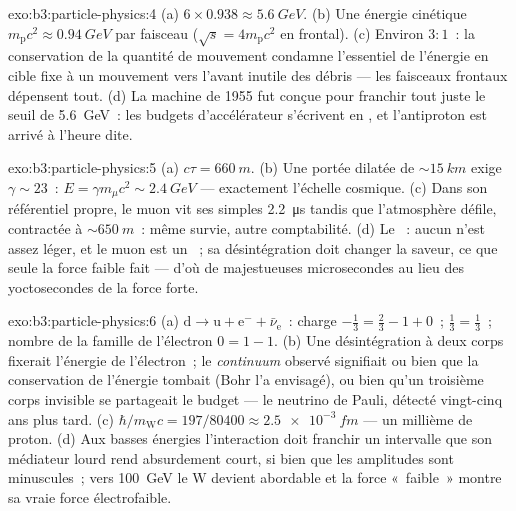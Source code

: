 \begin{solution}{exo:b3:particle-physics:4}
(a) $6\times0.938 \approx \qty{5.6}{GeV}$. (b) Une énergie cinétique
$m_{\text{p}}c^2 \approx \qty{0.94}{GeV}$ par faisceau
($\sqrt s = 4m_{\text{p}}c^2$ en frontal). (c) Environ $3:1$~: la
conservation de la quantité de mouvement condamne l'essentiel de
l'énergie en cible fixe à un mouvement vers l'avant inutile des
débris --- les faisceaux frontaux dépensent tout. (d) La machine de
1955 fut conçue pour franchir tout juste le seuil de
\qty{5.6}{GeV}~: les budgets d'accélérateur s'écrivent en , et l'antiproton est arrivé à l'heure dite.
\end{solution}

\begin{solution}{exo:b3:particle-physics:5}
(a) $c\tau = \qty{660}{m}$. (b) Une portée dilatée de
${\sim}\qty{15}{km}$ exige $\gamma \sim 23$~: $E = \gamma
m_\mu c^2 \sim \qty{2.4}{GeV}$ --- exactement l'échelle cosmique.
(c) Dans son référentiel propre, le muon vit ses simples
\qty{2.2}{\micro s} tandis que l'atmosphère défile, contractée à
${\sim}\qty{650}{m}$~: même survie, autre comptabilité. (d) Le
~: aucun  n'est assez léger, et le muon est
un ~; sa désintégration doit changer la saveur, ce que seule
la force faible fait --- d'où de majestueuses microsecondes au lieu
des yoctosecondes de la force forte.
\end{solution}

\begin{solution}{exo:b3:particle-physics:6}
(a) $\text{d} \to \text{u} + \text{e}^- + \bar\nu_{\text{e}}$~:
charge $-\tfrac13 = \tfrac23 - 1 + 0$~; 
$\tfrac13 = \tfrac13$~; nombre de la famille de l'électron
$0 = 1 - 1$. (b) Une désintégration à deux corps fixerait l'énergie
de l'électron~; le \emph{continuum} observé signifiait ou bien que la
conservation de l'énergie tombait (Bohr l'a envisagé), ou bien qu'un
troisième corps invisible se partageait le budget --- le neutrino de
Pauli, détecté vingt-cinq ans plus tard.
(c) $\hbar/m_{\text{W}}c = 197/80400 \approx
\qty{2.5e-3}{fm}$ --- un millième de proton. (d) Aux basses énergies
l'interaction doit franchir un intervalle que son médiateur lourd
rend absurdement court, si bien que les amplitudes sont minuscules~;
vers \qty{100}{GeV} le W devient abordable et la force «~faible~»
montre sa vraie force électrofaible.
\end{solution}

